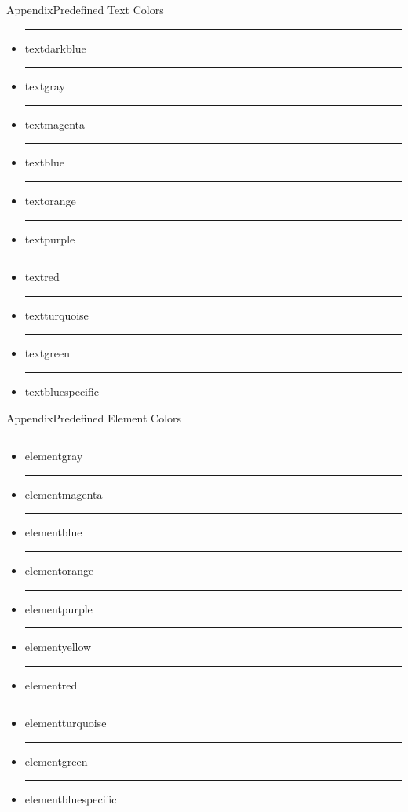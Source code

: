 \documentclass{beamer}
\begin{document}
\begin{frame}{Appendix}{Predefined Text Colors}
	\begin{itemize}
		\item {\color{textbluedark}\rule{.7cm}{.4cm} textdarkblue}
		\item {\color{textgray}\rule{.7cm}{.4cm} textgray}
		\item {\color{textmagenta}\rule{.7cm}{.4cm} textmagenta}
		\item {\color{textblue}\rule{.7cm}{.4cm} textblue}
		\item {\color{textorange}\rule{.7cm}{.4cm} textorange}
		\item {\color{textpurple}\rule{.7cm}{.4cm} textpurple}
		\item {\color{textred}\rule{.7cm}{.4cm} textred}
		\item {\color{textturquoise}\rule{.7cm}{.4cm} textturquoise}
		\item {\color{textgreen}\rule{.7cm}{.4cm} textgreen}
		\item {\color{textbluespecific}\rule{.7cm}{.4cm} textbluespecific}
	\end{itemize}
\end{frame}

\begin{frame}{Appendix}{Predefined Element Colors}
	\begin{itemize}
		\item {\color{elementgray}\rule{.7cm}{.4cm} elementgray}
		\item {\color{elementmagenta}\rule{.7cm}{.4cm} elementmagenta}
		\item {\color{elementblue}\rule{.7cm}{.4cm} elementblue}
		\item {\color{elementorange}\rule{.7cm}{.4cm} elementorange}
		\item {\color{elementpurple}\rule{.7cm}{.4cm} elementpurple}
		\item {\color{elementyellow}\rule{.7cm}{.4cm} elementyellow}
		\item {\color{elementred}\rule{.7cm}{.4cm} elementred}
		\item {\color{elementturquoise}\rule{.7cm}{.4cm} elementturquoise}
		\item {\color{elementgreen}\rule{.7cm}{.4cm} elementgreen}
		\item {\color{elementbluespecific}\rule{.7cm}{.4cm} elementbluespecific}
	\end{itemize}
\end{frame}
\end{document}
